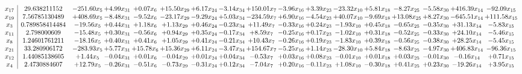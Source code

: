\documentclass[9pt]{article}
\begin{document}
 \[\begin{array}{c| c c@{\hskip 2pt} c@{\hskip 2pt} c@{\hskip 2pt} c@{\hskip 2pt} c@{\hskip 2pt} c@{\hskip 2pt} c@{\hskip 2pt} c@{\hskip 2pt} c@{\hskip 2pt} c@{\hskip 2pt} c@{\hskip 2pt} c@{\hskip 2pt} c@{\hskip 2pt} c@{\hskip 2pt} c@{\hskip 2pt} }
 x_{17}   &  29.638211152 & -251.60 x_{5} & +  4.99 x_{31} & +  0.07 x_{6} & + 15.50 x_{29} & +  6.17 x_{24} & -3.14 x_{34} & + 150.01 x_{7} & -3.96 x_{16} & +  3.39 x_{23} & -23.32 x_{10} & +  5.81 x_{18} & -8.27 x_{25} & -5.58 x_{30} & + 416.39 x_{14} & -92.09 x_{15}\\
 x_{19}   &  7.56785130489 & + 408.69 x_{5} & -8.48 x_{31} & -9.52 x_{6} & -23.17 x_{29} & -9.29 x_{24} & +  5.03 x_{34} & -234.59 x_{7} & +  6.90 x_{16} & -4.54 x_{23} & + 40.07 x_{10} & -9.69 x_{18} & + 13.08 x_{25} & +  8.27 x_{30} & -645.51 x_{14} & + 111.58 x_{15}\\
 x_{3}   &  0.789858414484 & -19.56 x_{5} & +  0.44 x_{31} & +  1.18 x_{6} & +  1.13 x_{29} & +  0.46 x_{24} & -0.23 x_{34} & + 11.49 x_{7} & -0.33 x_{16} & +  0.24 x_{23} & -1.93 x_{10} & +  0.45 x_{18} & -0.65 x_{25} & -0.35 x_{30} & + 31.13 x_{14} & -5.83 x_{15}\\
 x_{11}   &  2.798000609 & -15.48 x_{5} & +  0.30 x_{31} & -0.56 x_{6} & +  0.94 x_{29} & +  0.35 x_{24} & -0.17 x_{34} & +  8.59 x_{7} & -0.25 x_{16} & +  0.17 x_{23} & -1.02 x_{10} & +  0.31 x_{18} & -0.52 x_{25} & -0.33 x_{30} & + 24.10 x_{14} & -5.46 x_{15}\\
 x_{8}   &  1.24601761211 & -18.16 x_{5} & +  0.40 x_{31} & +  0.41 x_{6} & +  1.05 x_{29} & +  0.41 x_{24} & -0.21 x_{34} & + 10.43 x_{7} & -0.26 x_{16} & +  0.19 x_{23} & -1.83 x_{10} & +  0.39 x_{18} & -0.56 x_{25} & -0.38 x_{30} & + 28.25 x_{14} & -5.45 x_{15}\\
 x_{21}   &  33.280906172 & -283.93 x_{5} & +  5.77 x_{31} & + 15.78 x_{6} & + 15.36 x_{29} & +  6.11 x_{24} & -3.47 x_{34} & + 154.67 x_{7} & -5.25 x_{16} & +  1.14 x_{23} & -28.30 x_{10} & +  5.84 x_{18} & -8.63 x_{25} & -4.97 x_{30} & + 406.83 x_{14} & -96.36 x_{15}\\
 x_{12}   &  1.44085138605 & +  1.44 x_{5} & -0.04 x_{31} & +  0.01 x_{6} & -0.04 x_{29} & +  0.01 x_{24} & +  0.04 x_{34} & -0.53 x_{7} & +  0.03 x_{16} & +  0.08 x_{23} & -0.01 x_{10} & +  0.01 x_{18} & +  0.03 x_{25} & -0.01 x_{30} & -0.16 x_{14} & +  0.71 x_{15}\\
 x_{4}   &  2.4730884607 & + 12.79 x_{5} & -0.26 x_{31} & -0.51 x_{6} & -0.73 x_{29} & -0.31 x_{24} & +  0.12 x_{34} & -7.04 x_{7} & +  0.20 x_{16} & -0.11 x_{23} & +  1.08 x_{10} & -0.30 x_{18} & +  0.41 x_{25} & +  0.23 x_{30} & -19.26 x_{14} & +  3.95 x_{15}\\

\end{array}\]
\end{document}
